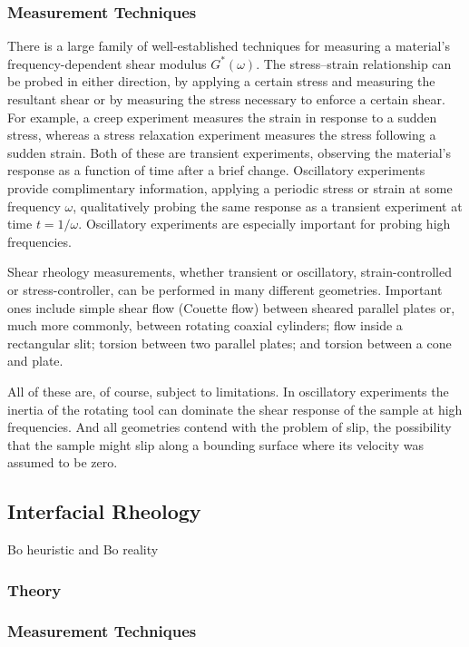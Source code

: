 \subsubsection{Measurement Techniques}

There is a large family of well-established techniques for measuring a material's frequency-dependent shear modulus $G^*(\omega)$. The stress--strain relationship can be probed in either direction, by applying a certain stress and measuring the resultant shear or by measuring the stress necessary to enforce a certain shear. For example, a creep experiment measures the strain in response to a sudden stress, whereas a stress relaxation experiment measures the stress following a sudden strain. Both of these are transient experiments, observing the material's response as a function of time after a brief change. Oscillatory experiments provide complimentary information, applying a periodic stress or strain at some frequency $\omega$, qualitatively probing the same response as a transient experiment at time $t=1/\omega$. Oscillatory experiments are especially important for probing high frequencies.

Shear rheology measurements, whether transient or oscillatory, strain-controlled or stress-controller, can be performed in many different geometries. Important ones include simple shear flow (Couette flow) between sheared parallel plates or, much more commonly, between rotating coaxial cylinders; flow inside a rectangular slit; torsion between two parallel plates; and torsion between a cone and plate.

All of these are, of course, subject to limitations. In oscillatory experiments the inertia of the rotating tool can dominate the shear response of the sample at  high frequencies. And all geometries contend with the problem of slip, the possibility that the sample might slip along a bounding surface where its velocity was assumed to be zero.


\subsection{Interfacial Rheology}
Bo heuristic and Bo reality
\subsubsection{Theory}
\subsubsection{Measurement Techniques}
